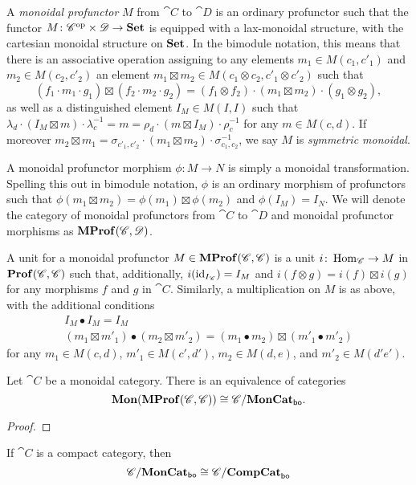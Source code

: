\documentclass[12pt,oneside,article,draft]{memoir}
\begin{document}
A \emph{monoidal profunctor} $M$ from $\cat{C}$ to $\cat{D}$ is an ordinary profunctor such that the functor $M\colon {\mathscr{C}}^{\text{op}}\times\mathscr{D}\to\mathbf{Set}$ is equipped with a lax-monoidal structure, with the cartesian monoidal structure on $\mathbf{Set}$. In the bimodule notation, this means that there is an associative operation assigning to any elements $m_1\in M(c_1,c'_1)$ and $m_2\in M(c_2,c'_2)$ an element $m_1\boxtimes m_2\in M(c_1\otimes c_2,c'_1\otimes c'_2)$ such that
\[
	(f_1\cdot m_1\cdot g_1)\boxtimes(f_2\cdot m_2\cdot g_2) = (f_1\otimes f_2)\cdot(m_1\boxtimes m_2)\cdot(g_1\otimes g_2),
\]
as well as a distinguished element $I_M\in M(I,I)$ such that $\lambda_d\cdot(I_M\boxtimes m)\cdot\lambda^{-1}_c = m = \rho_d\cdot(m\boxtimes I_M)\cdot\rho^{-1}_c$ for any $m\in M(c,d)$. If moreover $m_2\boxtimes m_1 = \sigma_{c'_1,c'_2}\cdot(m_1\boxtimes m_2)\cdot\sigma_{c_1,c_2}^{-1}$, we say $M$ is \emph{symmetric monoidal}.

A monoidal profunctor morphism $\phi\colon M\to N$ is simply a monoidal transformation. Spelling this out in bimodule notation, $\phi$ is an ordinary morphism of profunctors such that $\phi(m_1\boxtimes m_2)=\phi(m_1)\boxtimes\phi(m_2)$ and $\phi(I_M)=I_N$. We will denote the category of monoidal profunctors from $\cat{C}$ to $\cat{D}$ and monoidal profunctor morphisms as $\mathbf{MProf}(\mathscr{C},\mathscr{D})$. 

A unit for a monoidal profunctor $M\in\mathbf{MProf}(\mathscr{C},\mathscr{C})$ is a unit $i\colon\operatorname{Hom}_{\mathscr{C}}\to M$ in $\mathbf{Prof}(\mathscr{C},\mathscr{C})$ such that, additionally, $i(\operatorname{id}_{I_{\mathscr{C}}})=I_M$ and $i(f\otimes g)=i(f)\boxtimes i(g)$ for any morphisms $f$ and $g$ in $\cat{C}$. Similarly, a multiplication on $M$ is as above, with the additional conditions
\begin{gather*}
	I_M\bullet I_M=I_M \\
	(m_1\boxtimes m'_1)\bullet(m_2\boxtimes m'_2) = (m_1\bullet m_2)\boxtimes(m'_1\bullet m'_2)
\end{gather*}
for any $m_1\in M(c,d)$, $m'_1\in M(c',d')$, $m_2\in M(d,e)$, and $m'_2\in M(d'e')$.

\begin{lemma}\label{Lem:mon profs equal boo functors}
	Let $\cat{C}$ be a monoidal category. There is an equivalence of categories 
\[
\mathbf{Mon}(\mathbf{MProf}(\mathscr{C},\mathscr{C}))\cong \mathscr{C}/\mathbf{MonCat}_{\mathsf{bo}}.
\]
\begin{proof}


\end{proof}


\begin{lemma}\label{lemma:easy compcat}

If $\cat{C}$ is a compact category, then
\[
  \mathscr{C}/\mathbf{MonCat}_{\mathsf{bo}}\cong\mathscr{C}/\mathbf{CompCat}_{\mathsf{bo}}
\]
\end{lemma}


\end{lemma}
\end{document}
